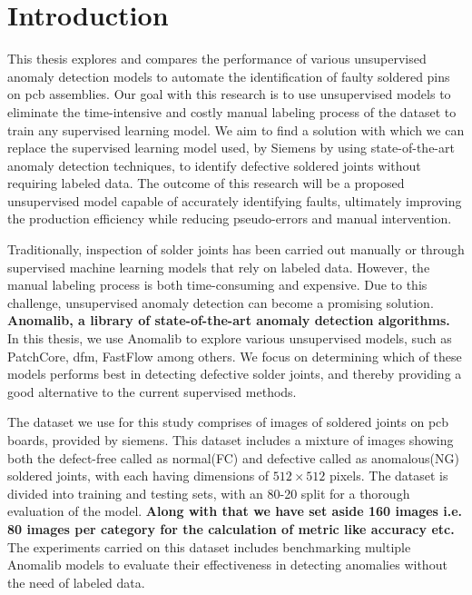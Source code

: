 \chapter{Introduction}
\label{sec:introduction}

This thesis explores and compares the performance of various unsupervised anomaly detection models to automate the identification of faulty soldered pins on \gls{pcb} assemblies. Our goal with this research is to use unsupervised models to eliminate the time-intensive and costly manual labeling process of the dataset to train any supervised learning model. We aim to find a solution with which we can replace the supervised learning model used, by Siemens by using state-of-the-art anomaly detection techniques, to identify defective soldered joints without requiring labeled data. The outcome of this research will be a proposed unsupervised model capable of accurately identifying faults, ultimately improving the production efficiency while reducing pseudo-errors and manual intervention.

Traditionally, inspection of solder joints has been carried out manually or through supervised machine learning models that rely on labeled data. However, the manual labeling process is both time-consuming and expensive. Due to this challenge, unsupervised anomaly detection can become a promising solution. \textbf{Anomalib\cite{Anomalib2024}, a library of state-of-the-art anomaly detection algorithms.} In this thesis, we use Anomalib to explore various unsupervised models, such as PatchCore\cite{roth2022totalrecallindustrialanomaly}, \gls{dfm}\cite{ahuja2019probabilisticmodelingdeepfeatures}, FastFlow\cite{yu2021fastflowunsupervisedanomalydetection} among others. We focus on determining which of these models performs best in detecting defective solder joints, and thereby providing a good alternative to the current supervised methods. %

The dataset we use for this study comprises of images of soldered joints on \gls{pcb} boards, provided by siemens. This dataset includes a mixture of images showing both the defect-free called as normal(FC) and defective called as anomalous(NG) soldered joints, with each having dimensions of $512\times512$ pixels. The dataset is divided into training and testing sets, with an 80-20 split for a thorough evaluation of the model. \textbf{Along with that we have set aside 160 images i.e. 80 images per category for the calculation of metric like accuracy etc.} The experiments carried on this dataset includes benchmarking multiple Anomalib models to evaluate their effectiveness in detecting anomalies without the need of labeled data.

